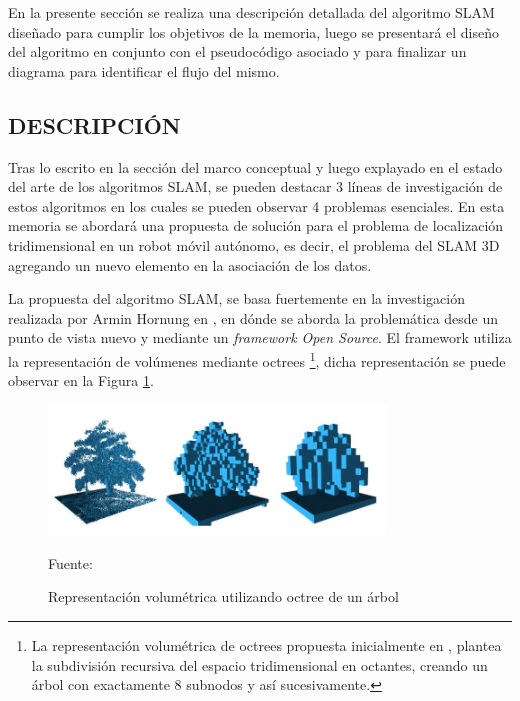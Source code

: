 En la presente sección se realiza una descripción detallada del algoritmo SLAM diseñado para cumplir los objetivos de la memoria, luego se presentará el diseño del algoritmo en conjunto con el pseudocódigo asociado y para finalizar un diagrama para identificar el flujo del mismo.


\subsection{DESCRIPCIÓN}
Tras lo escrito en la sección del marco conceptual y luego explayado en el estado del arte de los algoritmos SLAM, se pueden destacar 3 líneas de investigación de estos algoritmos en los cuales se pueden observar 4 problemas esenciales. En esta memoria se abordará una propuesta de solución para el problema de localización tridimensional en un robot móvil autónomo, es decir, el problema del SLAM 3D agregando un nuevo elemento en la asociación de los datos.

La propuesta del algoritmo SLAM, se basa fuertemente en la investigación realizada por Armin Hornung en \cite{hornung13auro}, en dónde se aborda la problemática desde un punto de vista nuevo y mediante un \textit{framework Open Source}. El framework utiliza la representación de volúmenes mediante octrees \footnote{ La representación volumétrica de octrees propuesta inicialmente en \cite{614315}, plantea la subdivisión recursiva del espacio tridimensional en octantes, creando un árbol con exactamente 8 subnodos y así sucesivamente.}, dicha representación se puede observar en la Figura \ref{fig:octree_tree}.

\begin{figure}[h]
    \centering
    \includegraphics[width=0.8\textwidth]{figures/03propuesta_solucion/octree_mapping.JPG}
    \caption{\label{fig:octree_tree} Representación volumétrica utilizando octree de un árbol} 
    Fuente: \cite{inproceedings}
\end{figure}

